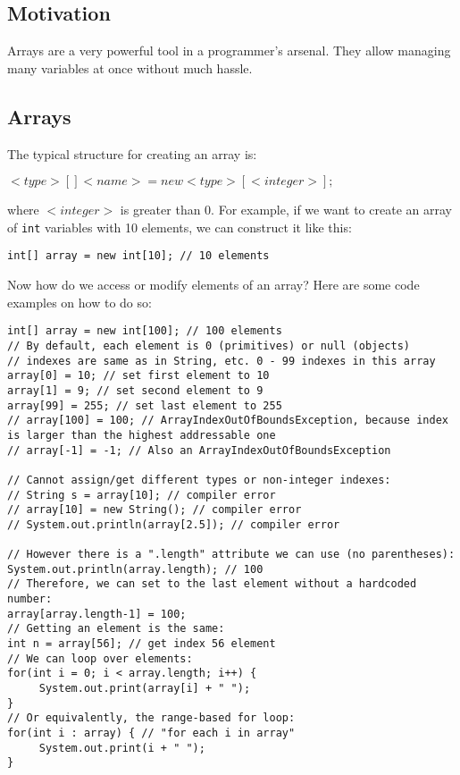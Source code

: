 
\subsection{Motivation}
Arrays are a very powerful tool in a programmer's arsenal. They allow managing many variables at once without much hassle.

\subsection{Arrays}
The typical structure for creating an array is:
\begin{center}
$<type>[] <name> = new <type>[<integer>];$
\end{center}
where $<integer>$ is greater than 0. For example, if we want to create an array of \verb|int| variables with 10 elements, we can construct it like this:
\begin{lstlisting}
int[] array = new int[10]; // 10 elements
\end{lstlisting}
Now how do we access or modify elements of an array? Here are some code examples on how to do so:
\begin{lstlisting}
int[] array = new int[100]; // 100 elements
// By default, each element is 0 (primitives) or null (objects)
// indexes are same as in String, etc. 0 - 99 indexes in this array
array[0] = 10; // set first element to 10
array[1] = 9; // set second element to 9
array[99] = 255; // set last element to 255
// array[100] = 100; // ArrayIndexOutOfBoundsException, because index is larger than the highest addressable one
// array[-1] = -1; // Also an ArrayIndexOutOfBoundsException

// Cannot assign/get different types or non-integer indexes:
// String s = array[10]; // compiler error
// array[10] = new String(); // compiler error
// System.out.println(array[2.5]); // compiler error

// However there is a ".length" attribute we can use (no parentheses):
System.out.println(array.length); // 100
// Therefore, we can set to the last element without a hardcoded number:
array[array.length-1] = 100;
// Getting an element is the same:
int n = array[56]; // get index 56 element
// We can loop over elements:
for(int i = 0; i < array.length; i++) {
     System.out.print(array[i] + " ");
}
// Or equivalently, the range-based for loop:
for(int i : array) { // "for each i in array"
     System.out.print(i + " ");
}
\end{lstlisting}

